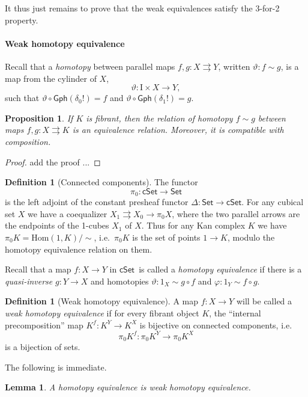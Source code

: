 \documentclass[11pt]{article}
\newcommand{\Set}{\ensuremath{\mathsf{Set}}}
\newcommand{\cSet}{\ensuremath{\mathsf{cSet}}}
\renewcommand{\hom}{\ensuremath{\mathrm{Hom}}}
\newcommand{\ra}{\ensuremath{\rightarrow}}
\newcommand{\I}{\ensuremath{\mathrm{I}}}
\newtheorem{proposition}[theorem]{Proposition}
\newtheorem{lemma}[theorem]{Lemma}
\theoremstyle{remark}
\theoremstyle{definition}
\newtheorem{definition}[theorem]{Definition}
\begin{document}
It thus just remains to prove that the weak equivalences satisfy the 3-for-2 property.

\paragraph{Weak homotopy equivalence}

Recall that a \emph{homotopy} between parallel maps $f, g: X\rightrightarrows Y$, written $\vartheta : f \sim g$,  is a map from the cylinder of $X$,
\[
\vartheta : \I\times X \to Y,
\]
such that $\vartheta \circ \mathsf{Gph}(\delta_0!) = f$ and $\vartheta \circ \mathsf{Gph}(\delta_1!) = g$.  

\begin{proposition}
If $K$ is fibrant, then the relation of homotopy $f \sim g$ between maps $f,g: X\rightrightarrows K$ is an equivalence relation.  Moreover, it is compatible with composition. 
\end{proposition}
\begin{proof}
 add the proof ...
\end{proof}

\begin{definition}[Connected components]
The functor $$\pi_0 : \cSet\to\Set$$ is the left adjoint of the constant presheaf functor $\Delta : \Set\ra\cSet$.  For any cubical set $X$ we have a coequalizer $X_1\rightrightarrows X_0\ra \pi_0X$, where the two parallel arrows are the endpoints of the 1-cubes $X_1$ of $X$.   Thus for any Kan complex $K$ we have $\pi_0K = \hom(1,K)/\!\sim$, i.e.\ $\pi_0K$ is the set of points $1\ra K$, modulo the homotopy equivalence relation on them.
\end{definition}

Recall that a map $f: X\ra Y$ in \cSet\ is called a \emph{homotopy equivalence} if there is a \emph{quasi-inverse} $g: Y\ra X$ and homotopies $\vartheta : 1_X \sim g\circ f$ and $\varphi : 1_Y\sim f\circ g$.

\begin{definition}[Weak homotopy equivalence]
A map $f: X\ra Y$ will be called a \emph{weak homotopy equivalence} if for every fibrant object $K$, the ``internal precomposition'' map $K^f : K^Y \ra K^X$ is bijective on connected components, i.e.\  $$\pi_0K^f : \pi_0K^Y \to \pi_0K^X$$ is a bijection of sets.
\end{definition}

The following is immediate.
\begin{lemma}\label{lemma:HEisWHE}
A homotopy equivalence is weak homotopy equivalence.
\end{lemma}
\end{document}
